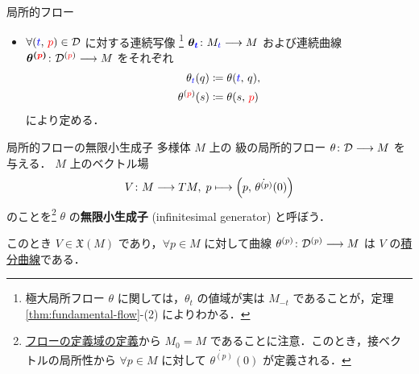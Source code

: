 \documentclass[TQFT_main]{subfiles}
\begin{document}
\begin{mydef}[label=def:local-flow, breakable]{局所的フロー}
\begin{itemize}
        \begin{align}
            \bm{M_{\textcolor{blue}{t}}} \coloneqq \bigl\{\, p \in M \bigm| (\textcolor{blue}{t},\, p) \in \mathcal{D} \,\bigr\} 
        \end{align}
        と定める\footnote{$\mathcal{D}^{(p)}$ はフローの領域 $\mathcal{D}$ を，点 $(0,\, p)$ を通るように「横に切り」，$M_{\textcolor{blue}{t}}$ は「縦に切る」と言うイメージ．}．
        \item $\forall (\textcolor{blue}{t},\, \textcolor{red}{p}) \in \mathcal{D}$ に対する連続写像
        \footnote{極大局所フロー $\theta$ に関しては，$\theta_t$ の値域が実は $M_{-t}$ であることが，定理\ref{thm:fundamental-flow}-(2) によりわかる．} 
        $\bm{\theta_{\textcolor{blue}{t}}} \colon M_{\textcolor{blue}{t}} \longrightarrow M$ および連続曲線 $\bm{\theta^{(\textcolor{red}{p})}} \colon \mathcal{D}^{(\textcolor{red}{p})} \longrightarrow M$ をそれぞれ 
        \begin{align}
            \theta_{\textcolor{blue}{t}} (q) &\coloneqq \theta(\textcolor{blue}{t},\, q),\\ 
            \theta^{(\textcolor{red}{p})} (s) &\coloneqq \theta(s,\, \textcolor{red}{p})
        \end{align}
        により定める．
    \end{itemize}
\end{mydef}

\begin{myprop}[label=prop:infinitesimal-generator-local,breakable]{局所的フローの無限小生成子}
    \cinfty 多様体 $M$ 上の \cinfty 級の局所的フロー $\theta \colon \mathcal{D} \longrightarrow M$ を与える．
    $M$ 上のベクトル場
    \begin{align}
        V \colon M \longrightarrow TM,\; p \longmapsto \left( p,\, \dot{\theta^{(p)}} (0)  \right) 
    \end{align}
    のことを\footnote{\hyperref[def:local-flow]{フローの定義域の定義}から $M_0 = M$ であることに注意．このとき，接ベクトルの局所性から $\forall p \in M$ に対して $\dot{\theta^{(p)}} (0)$ が定義される．} $\theta$ の\textbf{無限小生成子} (infinitesimal generator) と呼ぼう．

    このとき $V \in \mathfrak{X}(M)$ であり，$\forall p \in M$ に対して\cinfty 曲線 $\theta^{(p)} \colon \mathcal{D}^{(p)} \longrightarrow M$ は $V$ の\hyperref[def:integral-curve]{積分曲線}である．
\end{myprop}
\end{document}
